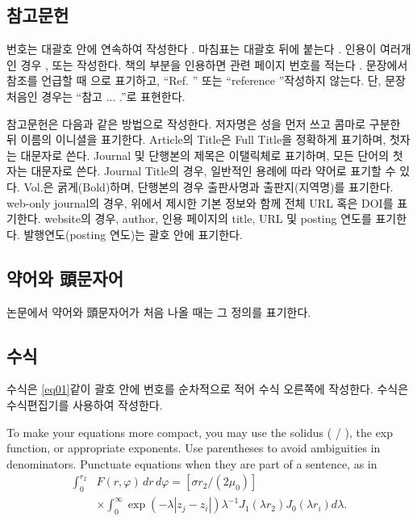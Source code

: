 \documentclass{fullpaper_hutech}
\begin{document}
\subsection{참고문헌}

번호는 대괄호 안에 연속하여 작성한다 \cite{True00}. 마침표는 대괄호 뒤에 붙는다 \cite{Schluter00}. 인용이 여러개인 경우 \cite{Schluter00}, \cite{Plazzo11} 또는 \cite{True00,Schluter00,Plazzo11} 작성한다. 책의 부분을 인용하면 관련 페이지 번호를 적는다 \cite{Schluter00}. 문장에서 참조를 언급할 때 \cite{Plazzo11}으로 표기하고, ``Ref. \cite{Plazzo11}'' 또는 ``reference \cite{Plazzo11}''\로 작성하지 않는다. 단, 문장 처음인 경우는 ``참고 \cite{Plazzo11}\은 ... .''로 표현한다.

참고문헌은 다음과 같은 방법으로 작성한다. 저자명은 성을 먼저 쓰고 콤마로 구분한 뒤 이름의 이니셜을 표기한다. Article의 Title은 Full Title을 정확하게 표기하며, 첫자는 대문자로 쓴다. Journal 및 단행본의 제목은 이탤릭체로 표기하며, 모든 단어의 첫자는 대문자로 쓴다. Journal Title의 경우, 일반적인 용례에 따라 약어로 표기할 수 있다.  Vol.은 굵게(Bold)하며, 단행본의 경우 출판사명과 출판지(지역명)를 표기한다. web-only journal의 경우, 위에서 제시한 기본 정보와 함께 전체 URL 혹은 DOI를 표기한다. website의 경우, author, 인용 페이지의 title, URL 및 posting 연도를 표기한다.  발행연도(posting 연도)는 괄호 안에 표기한다.

\subsection{약어와 頭문자어}

논문에서 약어와 頭문자어가 처음 나올 때는 그 정의를 표기한다.

\subsection{수식}

수식은 \eqref{eq01}\와 같이 괄호 안에 번호를 순차적으로 적어 수식 오른쪽에 작성한다. 수식은 수식편집기를 사용하여 작성한다. 

To make your equations more compact, you may use the solidus ( / ), the exp function, or appropriate exponents. Use parentheses to avoid ambiguities in denominators. Punctuate equations when they are part of a sentence, as in
\begin{equation}\label{eq01}
\begin{split}\int_0^{r_2} &F(r,\varphi)\,dr\,d\varphi=[\sigma r_2 /(2\mu_0 )] \\
&\times\int_0^{\infty} \exp(-\lambda |z_j -z_i |)\lambda^{-1} J_1 (\lambda r_2 )J_0 (\lambda r_i )d\lambda.\end{split}
\end{equation}
\end{document}

